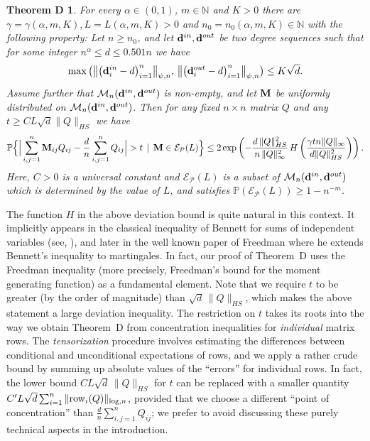 \documentclass[12pt]{article}
\newtheorem*{theoremD*}{Theorem D}
\theoremstyle{definition}
\theoremstyle{plain}
\newcommand{\N}{\mathbb{N}}
\newcommand{\Event}{\mathcal{E}}
\def\ranmtx{{\bf{}M}}
\def\Prob{{\mathbb P}}
\def\InDeg{{\bf d}^{in}}
\def\OutDeg{{\bf d}^{out}}
\def\MatrixSet{{\mathcal M}_n}
\def\Row{{\rm row}}
\def\pvector{{\mathcal P}}
\begin{document}
\begin{theoremD*}
For every $\alpha\in(0,1)$, $m\in\N$ and $K>0$
there are $\gamma=\gamma(\alpha,m,K), L=L(\alpha,m,K)>0$ and $n_0=n_0(\alpha,m,K)\in\N$ with the following property:
Let $n\geq n_0$,
and let $\InDeg, \OutDeg$ be two degree sequences
such that for some integer $n^\alpha\leq d\leq 0.501n$
we have
$$\max\big(\big\|\big(\InDeg_i-d\big)_{i=1}^n\big\|_{\psi,n},\,\big\|\big(\OutDeg_i-d\big)_{i=1}^n\big\|_{\psi,n}\big)\leq K\sqrt{d}.$$
Assume further that $\MatrixSet(\InDeg,\OutDeg)$ is non-empty,
and let $\ranmtx$ be uniformly distributed on $\MatrixSet(\InDeg,\OutDeg)$.
Then for any fixed $n\times n$ matrix $Q$ and any $t\geq CL\sqrt{d}\|Q\|_{HS}$ we have
\begin{align*}
\Prob\Big\{\Big|\sum_{i,j=1}^{n}
{\ranmtx}_{ij}Q_{ij}-\frac{d}{n}\sum_{i,j=1}^n Q_{ij}\Big|
>t\,\mid\,{\ranmtx}\in\Event_{\pvector}(L)
\Big\}
\leq 2\exp\left(-\frac{d\,\|Q\|_{HS}^2}{n\,\|Q\|_\infty^2}
\, H\left(\frac{\gamma tn\|Q\|_\infty}{d\|Q\|_{HS}^2}\right)\right).
\end{align*}
Here, $C>0$ is a universal constant and $\Event_{\pvector}(L)$ is a subset of $\MatrixSet(\InDeg,\OutDeg)$
which is determined by the value of $L$, and satisfies $\Prob(\Event_\pvector(L))\geq 1-n^{-m}$.
\end{theoremD*}

The function $H$ in the above deviation bound is quite natural in this context.
It implicitly appears in the classical inequality of Bennett for sums of independent variables
(see, \cite[Formula~8b]{Bennett}), and later in the well known paper of Freedman
\cite{Freedman} where he extends Bennett's inequality to martingales.
In fact, our proof of Theorem~D uses the Freedman inequality (more precisely, 
Freedman's bound for the moment generating function) as a fundamental element.
Note that we require $t$ to be greater (by the order of magnitude) than
$\sqrt{d}\,\|Q\|_{HS}$, which makes the above statement a large deviation inequality.
The restriction on $t$ takes its roots into the way we obtain Theorem~D from concentration
inequalities for {\it individual} matrix rows. The {\it tensorization} procedure
involves estimating the differences between conditional and unconditional expectations
of rows, and we apply a rather crude bound by summing up absolute values of the ``errors''
for individual rows. In fact, the lower bound $CL\sqrt{d}\,\|Q\|_{HS}$ for $t$
can be replaced with a smaller quantity $C'L\sqrt{d}\sum_{i=1}^n \|\Row_i(Q)\|_{\log,n}$,
provided that we choose a different ``point of concentration'' than $\frac{d}{n}\sum_{i,j=1}^n Q_{ij}$;
we prefer to avoid discussing these purely technical aspects in the introduction.
\end{document}
